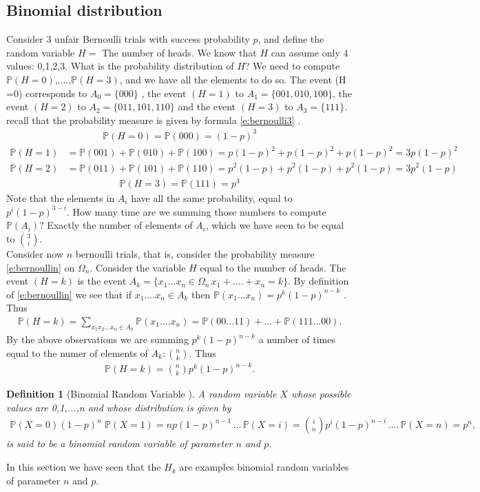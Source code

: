 \documentclass[12pt]{article}
\newtheorem{definition}[theorem]{Definition}
\newcommand{\<}{{\langle \!\! \langle}}
\renewcommand{\>}{{\rangle \!\! \rangle}}
\newcommand{\bel}[2]{\begin{equation} \label{#1} \begin{split} #2
 					\end{split} \end{equation}}
\begin{document}
\subsection{Binomial distribution}
Consider $3$ unfair Bernoulli trials with success probability $p$, and define the random variable $H= $ The number of heads. We know that $H$ can assume only 4 values: 0,1,2,3.  What is the probability distribution of $H$? We need to compute $\mathbb{P}(H=0)$,....,$\mathbb{P}(H = 3)$, and we have all the elements to do so. 
The event (H =0) corresponds to $A_0=\{000\}$ , the event $( H = 1) $ to $A_1 = \{001,010,100\}$, the event $(H =2 ) $ to $A_2=\{011,101,110\}$ and the event $(H = 3) $ to $A_3 =\{111\}$. 
recall that the probability measure is given by formula \eqref{e:bernoulli3} . 
\bel{}{\mathbb{P} ( H =0 ) = \mathbb{P}(000) = (1-p)^3}
\bel{}{\mathbb{P}(H = 1) & = \mathbb{P}(001)+ \mathbb{P}(010)+\mathbb{P}(100) = p(1-p)^2+ p(1-p)^2+ p(1-p)^2= 3p(1-p)^2}
\bel{}{\mathbb{P}(H = 2) & = \mathbb{P}(011)+ \mathbb{P}(101)+\mathbb{P}(110) = p^2(1-p)+ p^2(1-p)+ p^2(1-p)= 3p^2(1-p)}
\bel{}{\mathbb{P} ( H =3 ) = \mathbb{P}(111) = p^3}
Note that the elements in $A_i$ have all the same probability, equal to $p^i(1-p)^{3-i}$. How many time are we summing those numbers to compute $\mathbb{P}(A_i)$? Exactly the number of elements of $A_i$, which we have seen to be equal to ${3\choose i}$. \\
Consider now $n$ bernoulli trials, that is, consider the probability measure \eqref{e:bernoullin} on $\Omega_n$. Consider the variable $H$ equal to the number of heads. The event $ (H = k) $ is the event $A_k = \{x_1...x_n\in \Omega_n\, x_1+....+x_n = k\}$. By definition of \eqref{e:bernoullin} we see that  if $x_1....x_n\in A_k $ then $\mathbb{P}(x_1...x_n)= p^k(1-p)^{n-k}$ . Thus 
\bel{}{\mathbb{P}(H = k) =\sum_{x_1x_2...x_n\in A_k} \mathbb{P}(x_1....x_n) =\mathbb{P}(00...11)+...+ \mathbb{P}(111...00).}
By the above observations we are summing $p^k(1-p)^{n-k}$ a number of times equal to the numer of elements of $A_k: {n\choose k}$. Thus
\bel{}{\mathbb{P}( H = k ) = {n\choose k} p^k(1-p)^{n-k}.}
\begin{definition}[Binomial Random Variable ]
	A random variable $X$ whose possible values are 0,1,...,n and whose distribution is given by 
	\bel{}{\mathbb{P}(X =0) (1-p)^n\,\,\mathbb{P}( X = 1) = n p (1-p)^{n-1}\,...\, \mathbb{P} ( X = i) = {i\choose n}p^i(1-p)^{n-i}\,....\,\mathbb{P}( X =n ) = p^n,}
	is said to be a binomial random variable of parameter $n$ and $p$. 
\end{definition}
In this section we have seen that the $H_k$ are examples binomial random variables of parameter $n$ and $p$. 
\end{document}
